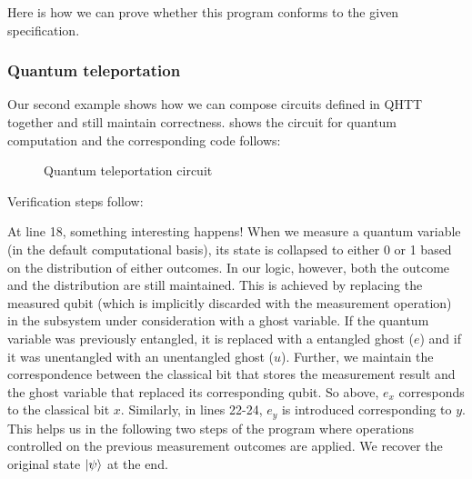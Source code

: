 \documentclass[adraft,creativecommons]{eptcs}
\theoremstyle{definition}
\theoremstyle{remark}
\begin{document}
Here is how we can prove whether this program conforms to the given specification.



\subsubsection{Quantum teleportation}
\label{sec:teleport}
Our second example shows how we can compose circuits defined in QHTT together and still maintain correctness.  shows the circuit for quantum computation and the corresponding code follows:

\begin{figure}
    \centering
    \caption{Quantum teleportation circuit}
    \label{fig:teleport}
\end{figure}



Verification steps follow:



At line 18, something interesting happens! When we measure a quantum variable (in the default computational basis), its state is collapsed to either 0 or 1 based on the distribution of either outcomes. In our logic, however, both the outcome and the distribution are still maintained. This is achieved by replacing the measured qubit (which is implicitly discarded with the measurement operation) in the subsystem under consideration with a ghost variable. If the quantum variable was previously entangled, it is replaced with a entangled ghost ($e$) and if it was unentangled with an unentangled ghost ($u$). Further, we maintain the correspondence between the classical bit that stores the measurement result and the ghost variable that replaced its corresponding qubit. So above, $e_x$ corresponds to the classical bit $x$. Similarly, in lines 22-24, $e_y$ is introduced corresponding to $y$. This helps us in the following two steps of the program where operations controlled on the previous measurement outcomes are applied. We recover the original state $\ket{\psi}$ at the end.
\end{document}
